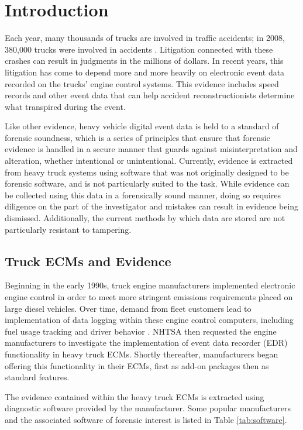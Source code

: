 \chapter{Introduction}
Each year, many thousands of trucks are involved in traffic accidents; in 2008, 380,000 trucks were involved in accidents \cite{NHTSA2008}.
Litigation connected with these crashes can result in judgments in the millions of dollars. In recent years, this litigation has 
come to depend more and more heavily on electronic event data recorded on the trucks' engine control systems. 
This evidence includes speed records and other event data that can help accident reconstructionists 
determine what transpired during the event.

Like other evidence, heavy vehicle digital event data is held to a standard of forensic soundness, which is a series of principles 
that ensure that forensic evidence is handled in a secure manner that guards against misinterpretation and alteration, whether intentional
or unintentional.
Currently, evidence is extracted from heavy truck systems using software that was not originally designed to be 
forensic software, and is not particularly suited to the task. While evidence can be collected using this data in a forensically sound 
manner, doing so requires diligence on the part of the investigator and mistakes can result in evidence being dismissed. Additionally, 
the current methods by which data are stored are not particularly resistant to tampering. 

\section{Truck ECMs and Evidence}

Beginning in the early 1990s, truck engine manufacturers implemented electronic engine control in order to meet more stringent emissions
requirements placed on large diesel vehicles. Over time, demand from fleet customers lead to implementation of data logging within these
engine control computers, including fuel usage tracking and driver behavior . NHTSA then requested the engine manufacturers to investigate the implementation
of event data recorder (EDR) functionality in heavy truck ECMs. Shortly thereafter, manufacturers began offering this functionality in their
ECMs, first as add-on packages then as standard features.

The evidence contained within the heavy truck ECMs is extracted using diagnostic software provided by the manufacturer. Some popular
manufacturers and the associated software of forensic interest is listed in Table \ref{tab:software}.


